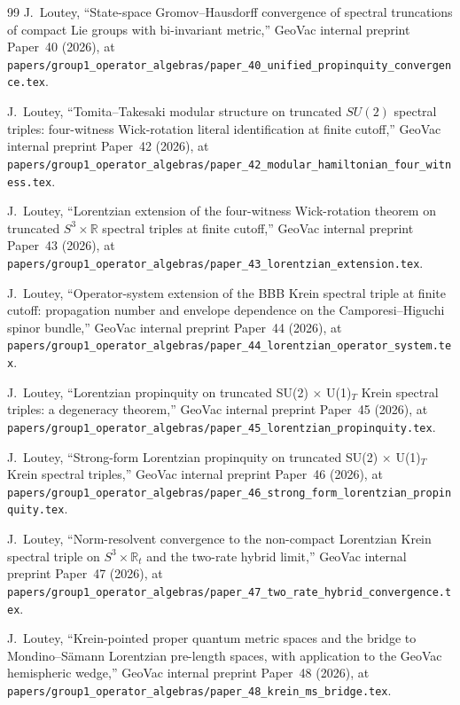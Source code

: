 \documentclass[11pt,a4paper]{article}
\theoremstyle{plain}
\theoremstyle{definition}
\newcommand{\sthree}{S^{3}}
\newcommand{\R}{\mathbb{R}}
\begin{document}
\begin{thebibliography}{99}
J.~Loutey, ``State-space Gromov--Hausdorff convergence of spectral
truncations of compact Lie groups with bi-invariant metric,'' GeoVac
internal preprint Paper~40 (2026), at
\texttt{papers/group1\_operator\_algebras/paper\_40\_unified\_propinquity\_convergence.tex}.

J.~Loutey, ``Tomita--Takesaki modular structure on truncated $SU(2)$
spectral triples: four-witness Wick-rotation literal identification
at finite cutoff,'' GeoVac internal preprint Paper~42 (2026), at
\texttt{papers/group1\_operator\_algebras/paper\_42\_modular\_hamiltonian\_four\_witness.tex}.

J.~Loutey, ``Lorentzian extension of the four-witness Wick-rotation
theorem on truncated $S^3 \times \mathbb{R}$ spectral triples at finite
cutoff,'' GeoVac internal preprint
Paper~43 (2026), at
\texttt{papers/group1\_operator\_algebras/paper\_43\_lorentzian\_extension.tex}.

J.~Loutey, ``Operator-system extension of the BBB Krein spectral
triple at finite cutoff: propagation number and envelope dependence
on the Camporesi--Higuchi spinor bundle,'' GeoVac internal preprint Paper~44 (2026),
at
\texttt{papers/group1\_operator\_algebras/paper\_44\_lorentzian\_operator\_system.tex}.

J.~Loutey, ``Lorentzian propinquity on truncated SU(2)
$\times$ U(1)$_{T}$ Krein spectral triples: a degeneracy theorem,'' GeoVac internal
preprint Paper~45 (2026), at
\texttt{papers/group1\_operator\_algebras/paper\_45\_lorentzian\_propinquity.tex}.

J.~Loutey, ``Strong-form Lorentzian propinquity on
truncated SU(2) $\times$ U(1)$_{T}$ Krein spectral triples,''
GeoVac internal preprint Paper~46 (2026), at
\texttt{papers/group1\_operator\_algebras/paper\_46\_strong\_form\_lorentzian\_propinquity.tex}.

J.~Loutey, ``Norm-resolvent convergence to the non-compact
Lorentzian Krein spectral triple on $\sthree\times\R_{t}$ and the
two-rate hybrid limit,'' GeoVac internal preprint Paper~47 (2026),
at
\texttt{papers/group1\_operator\_algebras/paper\_47\_two\_rate\_hybrid\_convergence.tex}.

J.~Loutey, ``Krein-pointed proper quantum metric spaces and the
bridge to Mondino--S\"amann Lorentzian pre-length spaces, with
application to the GeoVac hemispheric wedge,'' GeoVac internal
preprint Paper~48 (2026), at
\texttt{papers/group1\_operator\_algebras/paper\_48\_krein\_ms\_bridge.tex}.


\end{thebibliography}
\end{document}
